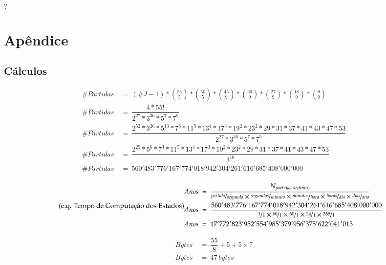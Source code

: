 \documentclass[dvipdfm, a4paper, 11pt]{article}
\begin{document}
?

\section{Apêndice}\label{apuxeandice}

\subsection{Cálculos}\label{cuxe1lculos}

\begin{equation} \label{eq_partidas} \tag{e.q. Números de Partidas Distintas}
\begin{split}
\#Partidas\ &=\  (\#J-1) * \binom{55}{5} * \binom{50}{5} * \binom{45}{9} * \binom{36}{9} * \binom{27}{9} * \binom{18}{9} * \binom{9}{9}\\
\#Partidas\ &=\ \dfrac{4 * 55!}{2^{27} * 3^{36} * 5^7 * 7^5}\\
\#Partidas\ &=\ \dfrac{2^{52} * 3^{26} * 5^{13} * 7^{8} * 11^{5} * 13^{4} * 17^{3} * 19^{2} * 23^{2} * 29 * 31 * 37 * 41 * 43 * 47 * 53}{2^{27} * 3^{36} * 5^7 * 7^5}\\
\#Partidas\ &=\ \dfrac{2^{25} * 5^{6} * 7^{3} * 11^{5} * 13^{4} * 17^{3} * 19^{2} * 23^{2} * 29 * 31 * 37 * 41 * 43 * 47 * 53}{3^{10}}\\
\#Partidas\ &=\ 560'483'776'167'774'018'942'304'261'616'685'408'000'000\\
\end{split}
\end{equation}

\begin{equation} \label{eq_anos_partidas} \tag{e.q. Tempo de Computação dos Estados}
\begin{split}
Anos\ &=\ \dfrac{N_{partidas\ distintos}}{\nicefrac{partida}{segundo}\times\nicefrac{segundos}{minuto}\times\nicefrac{minutos}{hora}\times\nicefrac{horas}{dia}\times\nicefrac{dias}{ano}}\\
Anos\ &=\ \dfrac{560'483'776'167'774'018'942'304'261'616'685'408'000'000}{\nicefrac{1}{1}\times\nicefrac{60}{1}\times\nicefrac{60}{1}\times\nicefrac{24}{1}\times\nicefrac{365}{1}}\\
Anos\ &=\ 17'772'823'952'554'985'379'956'375'622'041'013\\
\end{split}
\end{equation}

\begin{equation} \label{eq_bytes} \tag{e.q. Bytes na memória}
\begin{split}
Bytes\ &=\ \dfrac{55}{8} + 5 + 5\times 7\\
Bytes\ &=\ 47\ bytes
\end{split}
\end{equation}
\end{document}
